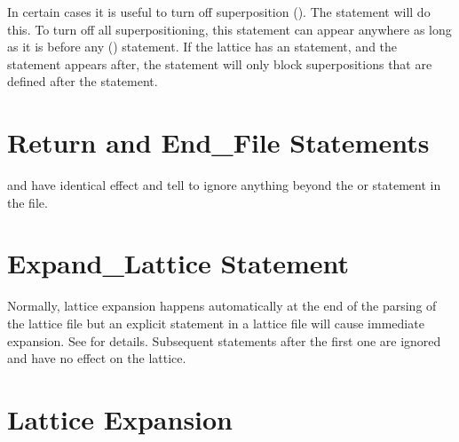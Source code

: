 {{{{{In certain cases it is useful to turn off superposition (). The 
statement will do this. To turn off all superpositioning, this statement can appear anywhere as long
as it is before any  () statement. If the lattice has an
 statement, and the  statement appears after, the
 statement will only block superpositions that are defined after the
 statement.

\section{Return and End_File Statements}

 and  have identical effect and tell \bmad to ignore anything beyond the
 or  statement in the file.

\section{Expand_Lattice Statement}
\label{s:expand.lat}

Normally, lattice expansion happens automatically at the end of the parsing of the lattice file but
an explicit  statement in a lattice file will cause immediate expansion. See
 for details. Subsequent  statements after the first one are
ignored and have no effect on the lattice.

\section{Lattice Expansion}
\label{s:expand}

}}}}}
